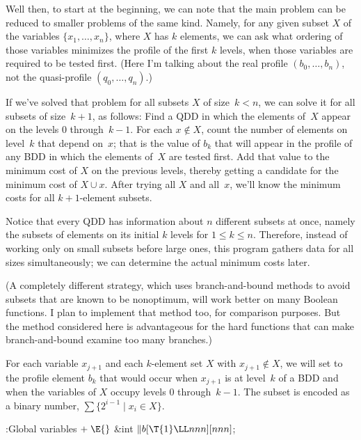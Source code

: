 Well then, to start at the beginning, we can note that the main problem
can be reduced to smaller problems of the same kind. Namely,
for any given subset $X$ of the variables $\{x_1,\ldots,x_n\}$,
where $X$ has $k$ elements,
we can ask what ordering of those variables minimizes the profile of the
first $k$ levels, when those variables are required to
be tested first. (Here I'm talking about the real profile
$(b_0,\ldots,b_n)$, not the quasi-profile $(q_0,\ldots,q_n)$.)

If we've solved that problem for all subsets $X$ of size~$k<n$, we can
solve it for all subsets of size~$k+1$, as follows: Find a
QDD in which the elements of~$X$ appear on the levels 0 through~$k-1$.
For each $x\notin X$, count the number of elements on level~$k$
that depend on~$x$; that is the value of $b_k$ that will appear in
the profile of any BDD in which the elements of~$X$ are tested first.
Add that value to the minimum cost of $X$ on the previous levels,
thereby getting a candidate for the minimum cost of $X\cup x$.
After trying all $X$ and all~$x$, we'll know the minimum costs for
all $k+1$-element subsets.

Notice that every QDD has information about $n$ different subsets
at once, namely the subsets of elements on its initial $k$ levels
for $1\le k\le n$. Therefore, instead of working only on small
subsets before large ones, this program gathers data for all sizes
simultaneously; we can determine the actual minimum costs later.

(A completely different strategy, which uses branch-and-bound
methods to avoid subsets that are known to be nonoptimum,
will work better on many Boolean functions. I plan to implement that
method too, for comparison purposes. But the method considered
here is advantageous for the hard functions that can make branch-and-bound
examine too many branches.)

For each variable $x_{j+1}$ and each $k$-element set $X$ with
$x_{j+1}\notin X$, we will set  to the profile element $b_k$
that would occur when $x_{j+1}$ is at level~$k$ of a BDD
and when the variables of $X$ occupy levels
0 through~$k-1$. The subset  is encoded as a binary number,
$\sum\{2^{i-1}\mid x_i\in X\}$.

\Y\B\4:Global variables\X${}\mathrel+\E{}$\6
\&{int} ${}\|b[\T{1}\LL\\{nnn}][\\{nnn}]{}$;\par
\fi

